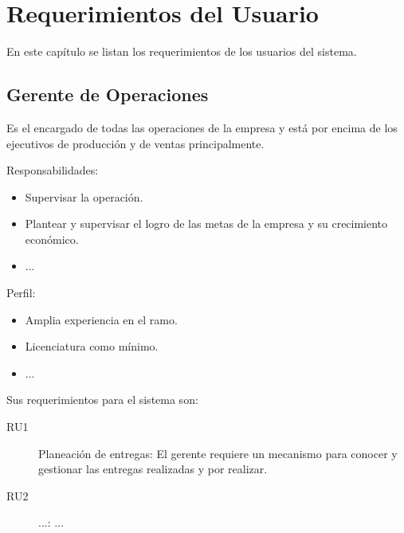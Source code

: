 \chapter{Requerimientos del Usuario}
\label{cap:reqUsr}

	En este capítulo se listan los requerimientos de los usuarios del sistema.


\begin{Usuario}{\section{Gerente de Operaciones}}{
	Es el encargado de todas las operaciones de la empresa y está por encima de los ejecutivos de producción y de ventas principalmente.
}
    \item[Responsabilidades:] \cdtEmpty
    \begin{itemize}
		\item Supervisar la operación.
		\item Plantear y supervisar el logro de las metas de la empresa y su crecimiento económico.
		\item ...
    \end{itemize}

	\item[Perfil:] \cdtEmpty
    \begin{itemize}
		\item Amplia experiencia en el ramo.
		\item Licenciatura como mínimo.
		\item ...
    \end{itemize}
\end{Usuario}

	Sus requerimientos para el sistema son:
\begin{description}
	\item[RU1] Planeación de entregas: El gerente requiere un mecanismo para conocer y gestionar las entregas realizadas y por realizar.
    \item[RU2] ...: ...
\end{description}

